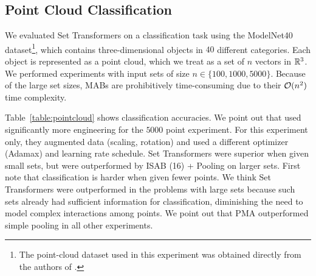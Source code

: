 \subsection{Point Cloud Classification}

We evaluated Set Transformers on a classification task using the ModelNet40~\citep{Chang2015} dataset\footnote{The point-cloud dataset used in this experiment was obtained directly from the authors of \citet{Zaheer2017}.}, which contains three-dimensional objects in $40$ different categories.
Each object is represented as a point cloud, which we treat as a set of $n$ vectors in $\mathbb{R}^3$.
We performed experiments with input sets of size $n \in \{100, 1000, 5000\}$.
Because of the large set sizes, MABs are prohibitively time-consuming due to their $\mathcal{O}(n^2)$ time complexity.

Table~\ref{table:pointcloud} shows classification accuracies.
We point out that \citet{Zaheer2017} used significantly more engineering for the $5000$ point experiment.
For this experiment only, they augmented data (scaling, rotation) and used a different optimizer (Adamax) and learning rate schedule.
Set Transformers were superior when given small sets, but were outperformed by ISAB (16) + Pooling on larger sets.
First note that classification is harder when given fewer points.
We think Set Transformers were outperformed in the problems with large sets because such sets already had sufficient information for classification, diminishing the need to model complex interactions among points.
We point out that PMA outperformed simple pooling in all other experiments.
